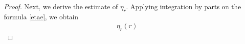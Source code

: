 \documentclass[a4paper,12pt,draft]{article}
\theoremstyle{remark}
\begin{document}
\begin{proof}
    Next, we derive the estimate of $\eta_r$. Applying integration by parts on the formula \eqref{etae}, we obtain
    \begin{align}
        \eta_r(r) %

\end{align}
\end{proof}
\end{document}
